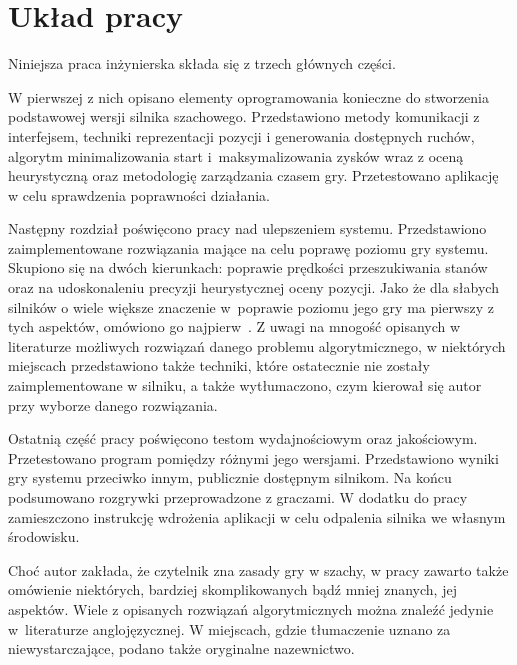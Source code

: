 \section{Układ pracy}
\label{sec:uklad-pracy}

Niniejsza praca inżynierska składa się z trzech głównych części.

W pierwszej z nich opisano elementy oprogramowania konieczne do stworzenia podstawowej wersji silnika szachowego.
Przedstawiono metody komunikacji z interfejsem, techniki reprezentacji pozycji i generowania dostępnych ruchów, algorytm minimalizowania start i~maksymalizowania zysków wraz z oceną heurystyczną oraz metodologię zarządzania czasem gry.
Przetestowano aplikację w celu sprawdzenia poprawności działania.

Następny rozdział poświęcono pracy nad ulepszeniem systemu.
Przedstawiono zaimplementowane rozwiązania mające na celu poprawę poziomu gry systemu.
Skupiono się na dwóch kierunkach: poprawie prędkości przeszukiwania stanów oraz na udoskonaleniu precyzji heurystycznej oceny pozycji.
Jako że dla słabych silników o wiele większe znaczenie w~poprawie poziomu jego gry ma pierwszy z tych aspektów, omówiono go najpierw~\cite*{Vrzina2023}.
Z uwagi na mnogość opisanych w literaturze możliwych rozwiązań danego problemu algorytmicznego, w niektórych miejscach przedstawiono także techniki, które ostatecznie nie zostały zaimplementowane w silniku, a także wytłumaczono, czym kierował się autor przy wyborze danego rozwiązania.

Ostatnią część pracy poświęcono testom wydajnościowym oraz jakościowym.
Przetestowano program pomiędzy różnymi jego wersjami.
Przedstawiono wyniki gry systemu przeciwko innym, publicznie dostępnym silnikom.
Na końcu podsumowano rozgrywki przeprowadzone z graczami.
W dodatku do pracy zamieszczono instrukcję wdrożenia aplikacji w celu odpalenia silnika we własnym środowisku.

Choć autor zakłada, że czytelnik zna zasady gry w szachy, w pracy zawarto także omówienie niektórych, bardziej skomplikowanych bądź mniej znanych, jej aspektów.
Wiele z opisanych rozwiązań algorytmicznych można znaleźć jedynie w~literaturze anglojęzycznej.
W miejscach, gdzie tłumaczenie uznano za niewystarczające, podano także oryginalne nazewnictwo.